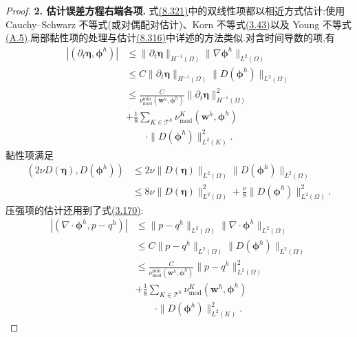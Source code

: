 \begin{proof}
\textbf{2. 估计误差方程右端各项.} 式\hyperref[eq:vms-coarse-projection-error-equation]{(8.321)}中的双线性项都以相近方式估计:使用 Cauchy--Schwarz 不等式(或对偶配对估计)、Korn 不等式\hyperref[eq:korn-inequality-v]{(3.43)}以及 Young 不等式\hyperref[eq:appendix-a-5]{(A.5)}.局部黏性项的处理与估计\hyperref[eq:vms-coarse-projection-stability-proof-estimate]{(8.316)}中详述的方法类似.对含时间导数的项,有
\[
\begin{aligned}
 |(\partial_t\symbf{\eta},\symbf{\phi}^h)|
 &\le \|\partial_t\symbf{\eta}\|_{H^{-1}(\Omega)}
       \|\nabla\symbf{\phi}^h\|_{L^2(\Omega)}\\
 &\le C\|\partial_t\symbf{\eta}\|_{H^{-1}(\Omega)}
       \|D(\symbf{\phi}^h)\|_{L^2(\Omega)}\\
 &\le \frac{C}{\nu_{\mathrm{mod}}^{\min}(\bm w^h,\symbf{\phi}^h)}
       \|\partial_t\symbf{\eta}\|_{H^{-1}(\Omega)}^2\\
 &+\frac18\sum_{K\in\mathcal T^h}\nu_{\mathrm{mod}}^K(\bm w^h,\symbf{\phi}^h)\\
 &\qquad\cdot\|D(\symbf{\phi}^h)\|_{L^2(K)}^2.
\end{aligned}
\]
黏性项满足
\[
\begin{aligned}
 (2\nu D(\symbf{\eta}),D(\symbf{\phi}^h))
 &\le 2\nu\|D(\symbf{\eta})\|_{L^2(\Omega)}
          \|D(\symbf{\phi}^h)\|_{L^2(\Omega)}\\
 &\le 8\nu\|D(\symbf{\eta})\|_{L^2(\Omega)}^2
       +\frac{\nu}{8}\|D(\symbf{\phi}^h)\|_{L^2(\Omega)}^2.
\end{aligned}
\]
压强项的估计还用到了式\hyperref[eq:divergence-by-gradient-h01]{(3.170)}:
\[
\begin{aligned}
 |(\nabla\cdot\symbf{\phi}^h,p-q^h)|
 &\le \|p-q^h\|_{L^2(\Omega)}
       \|\nabla\cdot\symbf{\phi}^h\|_{L^2(\Omega)}\\
 &\le C\|p-q^h\|_{L^2(\Omega)}
       \|D(\symbf{\phi}^h)\|_{L^2(\Omega)}\\
 &\le \frac{C}{\nu_{\mathrm{mod}}^{\min}(\bm w^h,\symbf{\phi}^h)}
       \|p-q^h\|_{L^2(\Omega)}^2\\
 &+\frac18\sum_{K\in\mathcal T^h}\nu_{\mathrm{mod}}^K(\bm w^h,\symbf{\phi}^h)\\
 &\qquad\cdot\|D(\symbf{\phi}^h)\|_{L^2(K)}^2.
\end{aligned}
\]


\end{proof}
